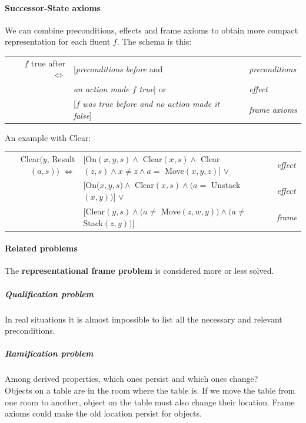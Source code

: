 \documentclass[10pt]{report}
\begin{document}
\paragraph{Successor-State axioms} We can combine preconditions, effects and frame axioms to obtain more compact representation for each fluent $f$. The schema is this:\begin{center}
\begin{tabular}{r l l}
$f$ true after $\Leftrightarrow$ & [\textit{preconditions before} and & \textit{preconditions}\\
& \textit{an action made $f$ true}] or & \textit{effect}\\
& [$f$ \textit{was true before and no action made it false}] & \textit{frame axioms}
\end{tabular}
\end{center}
An example with Clear:\begin{center}
\begin{tabular}{r l l}
Clear$(y$, Result$(a,s))$ $\Leftrightarrow$ & [On$(x,y,s)\wedge$ Clear$(x,s)\wedge$ Clear$(z,s)\wedge x\neq z \wedge a =$ Move$(x,y,z)$] $\vee$ & \textit{effect}\\
& [On($x,y,s)\wedge$ Clear$(x,s)\wedge(a =$ Unstack$(x,y))$] $\vee$ & \textit{effect}\\
& [Clear$(y,s)\wedge(a\neq$ Move$(z,w,y))\wedge(a\neq$ Stack$(z,y))$] & \textit{frame}
\end{tabular}
\end{center}
\paragraph{Related problems} The \textbf{representational frame problem} is considered more or less solved.
\subparagraph{Qualification problem} In real situations it is almost impossible to list all the necessary and relevant preconditions.
\subparagraph{Ramification problem} Among derived properties, which ones persist and which ones change?\\
Objects on a table are in the room where the table is. If we move the table from one room to another, object on the table must also change their location. Frame axioms could make the old location persist for objects.
\end{document}
